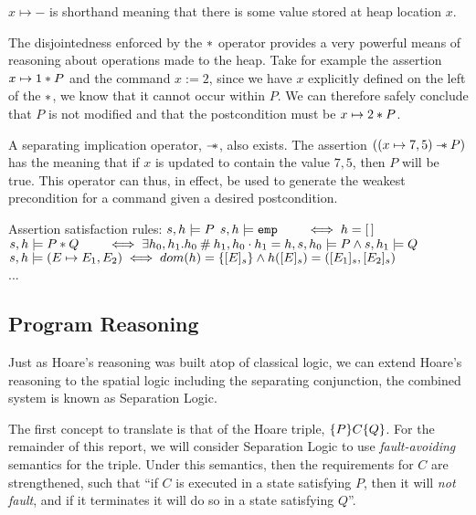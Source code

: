 \documentclass[a4paper]{report}
\begin{document}

  $x \mapsto -$ is shorthand meaning that there is some value stored at heap
  location $x$.

  The disjointedness enforced by the $\mathbin{*}$ operator provides a very powerful
  means of reasoning about operations made to the heap. Take for example the
  assertion $x \mapsto 1 \mathbin{*} P$ and the command $x := 2$, since we have $x$
  explicitly defined on the left of the $\mathbin{*}$, we know that it cannot occur
  within $P$. We can therefore safely conclude that $P$ is not modified and that
  the postcondition must be $x \mapsto 2 \mathbin{*} P$.

  A separating implication operator, $\mathbin{-\mkern-6mu *}$, also exists. The assertion $((x
  \mapsto 7, 5) \mathbin{-\mkern-6mu *} P)$ has the meaning that if $x$ is updated to contain the
  value $7, 5$, then $P$ will be true. This operator can thus, in effect, be
  used to generate the weakest precondition for a command given a desired
  postcondition.

  \begin{display}{Assertion satisfaction rules: $s,h \models P$}
    $s,h \models \texttt{emp} \qquad \iff h = [\,]$ \\
    $s,h \models P \mathbin{*} Q \qquad \iff \exists h_0, h_1.h_0 \mathbin{\#} h_1, h_0 \cdot
    h_1 = h, s, h_0 \models P \land s,h_1 \models Q$ \\
    $s,h \models (E \mapsto E_1, E_2) \iff dom(h) = \{[E]_s\} \land h([E]_s)
    = ([E_1]_s, [E_2]_s)$ \\
    ...
  \end{display}

  \subsection{Program Reasoning}

  Just as Hoare's reasoning was built atop of classical logic, we can extend
  Hoare's reasoning to the spatial logic including the separating conjunction,
  the combined system is known as Separation Logic.

  The first concept to translate is that of the Hoare triple, $\{P\}C\{Q\}$.
  For the remainder of this report, we will consider Separation Logic to use
  \emph{fault-avoiding} semantics for the triple. Under this semantics, then the
  requirements for $C$ are strengthened, such that ``if $C$ is executed in a
  state satisfying $P$, then it will \emph{not fault}, and if it terminates it
  will do so in a state satisfying $Q$''.
\end{document}
